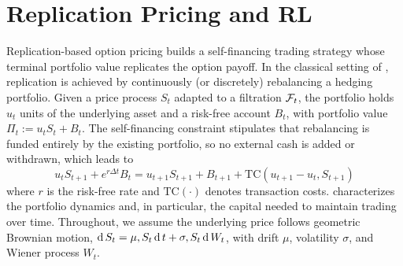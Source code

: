 \section{Replication Pricing and RL}
\label{sec:replication}


Replication-based option pricing builds a self-financing trading strategy whose terminal portfolio value replicates the option payoff.
In the classical setting of \cite{black1973pricing}, replication is achieved by continuously (or discretely) rebalancing a hedging portfolio.
Given a price process ${S_t}$ adapted to a filtration ${\mathcal{F}_t}$, the portfolio holds $u_t$ units of the underlying asset and a risk-free account $B_t$, with portfolio value
$
\Pi_t := u_t S_t + B_t .
$
The self-financing constraint stipulates that rebalancing is funded entirely by the existing portfolio, so no external cash is added or withdrawn, which leads to
{\small%
\begin{equation}
u_{t}S_{t+1}+e^{r\Delta t}B_{t}=u_{t+1}S_{t+1}+B_{t+1} + \text{TC}(u_{t+1}-u_t, S_{t+1}) \label{eq:self-financing}
\end{equation}
}where $r$ is the risk-free rate and $\text{TC}(\cdot)$ denotes transaction costs.
 characterizes the portfolio dynamics and, in particular, the capital needed to maintain trading over time.
Throughout, we assume the underlying price follows geometric Brownian motion,
$ \operatorname{d}S_t=\mu ,S_t \operatorname{d}t + \sigma ,S_t \operatorname{d}W_t $,
with drift $\mu$, volatility $\sigma$, and Wiener process $W_t$.



